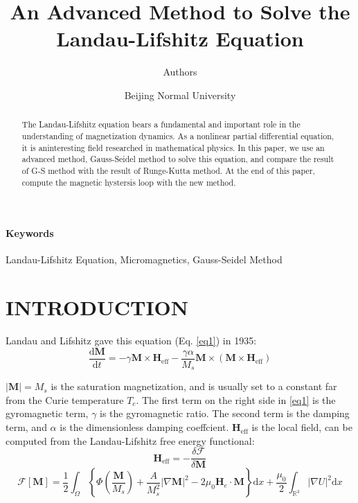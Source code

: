 \documentclass{article}
\renewcommand{\d}[2]{\frac{\text{d} #1}{\text{d} #2}} %
\begin{document}
\title{An Advanced Method to Solve the Landau-Lifshitz Equation}
\author{Authors}
\date{Beijing Normal University}
\maketitle


\begin{abstract}
The Landau-Lifshitz equation bears a fundamental and important role in the understanding of magnetization dynamics. As a nonlinear partial differential equation, it is aninteresting field researched in mathematical physics. In this paper, we use an advanced method, Gauss-Seidel method to solve this equation, and compare the result of G-S method with the result of Runge-Kutta method. At the end of this paper, compute the magnetic hystersis loop with the new method.
\end{abstract}
\paragraph{Keywords} Landau-Lifshitz Equation, Micromagnetics, Gauss-Seidel Method


\section{INTRODUCTION}
Landau and Lifshitz gave this equation (Eq. \eqref{eq1}) in 1935:
\begin{equation}
\d{\bm{M}}{t}=-\gamma \bm{M}\times \bm{H}_\text{eff}-\frac{\gamma \alpha}{M_s} \bm{M}\times \left(\bm{M}\times\bm{H}_\text{eff}\right)\label{eq1}
\end{equation}

$\left|\bm{M}\right|=M_s$ is the saturation magnetization, and is usually set to a constant far from the Curie temperature $T_c$. The first term on the right side in \eqref{eq1} is the gyromagnetic term, $\gamma$ is the gyromagnetic ratio. The second term is the damping term, and $\alpha$ is the dimensionless damping coeffcient. $\bm{H}_\text{eff}$ is the local field, can be computed from the Landau-Lifshitz free energy functional:
\begin{equation}
\bm{H}_\text{eff}=-\frac{\delta \mathcal{F}}{\delta \bm{M}}\label{eq2}
\end{equation}
\begin{equation}
\mathcal{F}\left[\bm{M}\right]=\frac{1}{2}\int_{\Omega}\left\{\Phi \left(\frac{\bm{M}}{M_s}\right)+\frac{A}{M_s^2}\left|\nabla\bm{M}\right|^2-2\mu_0\bm{H}_{e}\cdot \bm{M}\right\}\mathrm{d}x +\frac{\mu_0}{2}\int_{\mathbb{R}^3}\left|\nabla U\right|^2\mathrm{d}x\label{eq3}
\end{equation}
\end{document}
